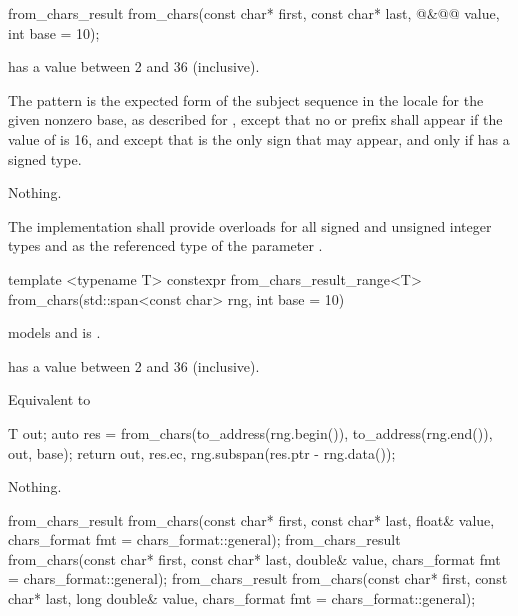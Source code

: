 \documentclass{wg21}
\begin{document}
%
\begin{itemdecl}
from_chars_result from_chars(const char* first, const char* last,
@\seebelow@&@\itcorr[-1]@ value, int base = 10);
\end{itemdecl}

\begin{itemdescr}
\pnum
\expects
{} has a value between 2 and 36 (inclusive).

\pnum
\effects
The pattern is the expected form of the subject sequence
in the  locale
for the given nonzero base,
as described for ,
except that no  or  prefix shall appear
if the value of  is 16,
and except that 
is the only sign that may appear,
and only if  has a signed type.

\pnum
\throws
Nothing.

\pnum
\remarks
The implementation shall provide overloads
for all signed and unsigned integer types
and 
as the referenced type of the parameter .
\end{itemdescr}

\begin{addedblock}
%
\begin{itemdecl}
template <typename T>
constexpr from_chars_result_range<T> from_chars(std::span<const char> rng, int base = 10)
\end{itemdecl}

\begin{itemdescr}

\constraints {} models  and  is .

\pnum
\expects
{} has a value between 2 and 36 (inclusive).

\pnum
\effects Equivalent to
\begin{codeblock}
T out;
auto res = from_chars(to_address(rng.begin()), to_address(rng.end()), out, base);
return {out, res.ec, rng.subspan(res.ptr - rng.data())};
\end{codeblock}

\pnum
\throws
Nothing.

\pnum
\end{itemdescr}

\end{addedblock}

%
\begin{itemdecl}
from_chars_result from_chars(const char* first, const char* last, float& value,
chars_format fmt = chars_format::general);
from_chars_result from_chars(const char* first, const char* last, double& value,
chars_format fmt = chars_format::general);
from_chars_result from_chars(const char* first, const char* last, long double& value,
chars_format fmt = chars_format::general);
\end{itemdecl}
\end{document}
